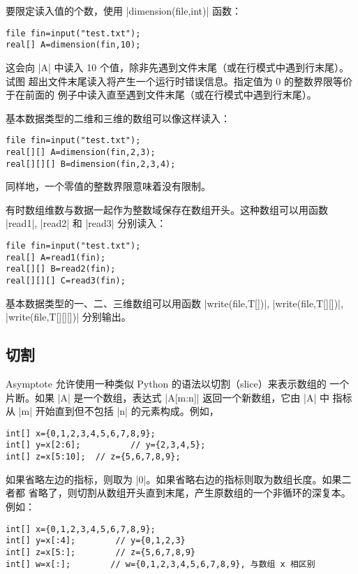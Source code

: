 \documentclass[nofonts,CJKnormalspaces]{ctexbook}[2009/05/20]
\newcommand*\prgname[1]{\textsf{#1}}
\begin{document}
{{{
要限定读入值的个数，使用 |dimension(file,int)| 函数：
\begin{lstlisting}
file fin=input("test.txt");
real[] A=dimension(fin,10);
\end{lstlisting}

这会向 |A| 中读入 10 个值，除非先遇到文件末尾（或在行模式中遇到行末尾）。试图
超出文件末尾读入将产生一个运行时错误信息。指定值为 0 的整数界限等价于在前面的
例子中读入直至遇到文件末尾（或在行模式中遇到行末尾）。

基本数据类型的二维和三维的数组可以像这样读入：
\begin{lstlisting}
file fin=input("test.txt");
real[][] A=dimension(fin,2,3);
real[][][] B=dimension(fin,2,3,4);
\end{lstlisting}
同样地，一个零值的整数界限意味着没有限制。

有时数组维数与数据一起作为整数域保存在数组开头。这种数组可以用函数 |read1|,
|read2| 和 |read3| 分别读入：
\begin{lstlisting}
file fin=input("test.txt");
real[] A=read1(fin);
real[][] B=read2(fin);
real[][][] C=read3(fin);
\end{lstlisting}

基本数据类型的一、二、三维数组可以用函数 |write(file,T[])|,
|write(file,T[][])|, |write(file,T[][][])| 分别输出。


\subsection{切割}

\prgname{Asymptote} 允许使用一种类似 Python 的语法以切割（slice）来表示数组的
一个片断。如果 |A| 是一个数组，表达式 |A[m:n]| 返回一个新数组，它由 |A| 中
指标从 |m| 开始直到但不包括 |n| 的元素构成。例如，
\begin{lstlisting}
int[] x={0,1,2,3,4,5,6,7,8,9};
int[] y=x[2:6];          // y={2,3,4,5};
int[] z=x[5:10];  // z={5,6,7,8,9};
\end{lstlisting}

如果省略左边的指标，则取为 |0|。如果省略右边的指标则取为数组长度。如果二者都
省略了，则切割从数组开头直到末尾，产生原数组的一个非循环的深复本。例如：
\begin{lstlisting}
int[] x={0,1,2,3,4,5,6,7,8,9};
int[] y=x[:4];        // y={0,1,2,3}
int[] z=x[5:];        // z={5,6,7,8,9}
int[] w=x[:];        // w={0,1,2,3,4,5,6,7,8,9}, 与数组 x 相区别
\end{lstlisting}

}}}
\end{document}
